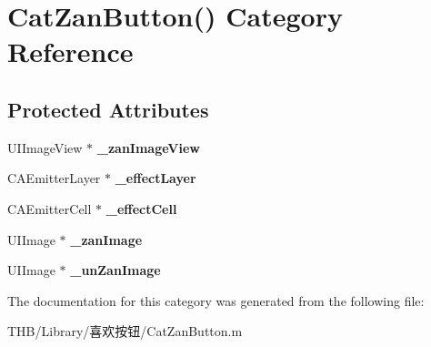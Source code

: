 \hypertarget{category_cat_zan_button_07_08}{}\section{Cat\+Zan\+Button() Category Reference}
\label{category_cat_zan_button_07_08}
\subsection*{Protected Attributes}
\begin{DoxyCompactItemize}
\item 
\mbox{\label{category_cat_zan_button_07_08_a58a946f054d2d357a887af60c83dfdc9}} 
U\+I\+Image\+View $\ast$ {\bfseries \+\_\+zan\+Image\+View}
\item 
\mbox{\label{category_cat_zan_button_07_08_ada5f048f01d90cbe93eff14857c6ad6f}} 
C\+A\+Emitter\+Layer $\ast$ {\bfseries \+\_\+effect\+Layer}
\item 
\mbox{\label{category_cat_zan_button_07_08_ae674ed347b2aacc67231b53fa9702d42}} 
C\+A\+Emitter\+Cell $\ast$ {\bfseries \+\_\+effect\+Cell}
\item 
\mbox{\label{category_cat_zan_button_07_08_a3676c684d2c5d8eaf80d83626142e251}} 
U\+I\+Image $\ast$ {\bfseries \+\_\+zan\+Image}
\item 
\mbox{\label{category_cat_zan_button_07_08_a953e43b229649dff829e3be59cdeef59}} 
U\+I\+Image $\ast$ {\bfseries \+\_\+un\+Zan\+Image}
\end{DoxyCompactItemize}


The documentation for this category was generated from the following file\+:\begin{DoxyCompactItemize}
\item 
T\+H\+B/\+Library/喜欢按钮/Cat\+Zan\+Button.\+m\end{DoxyCompactItemize}
